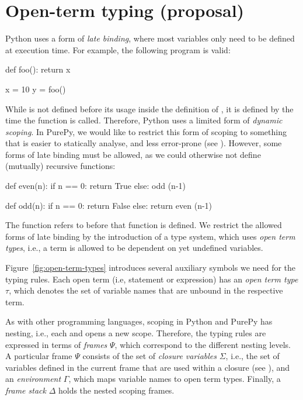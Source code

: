 \clearpage
\section{Open-term typing (proposal)}


Python uses a form of \emph{late binding}, where most variables only need to be defined at execution time. For example, 
the following program is valid: 

\begin{python}
def foo():
    return x

x = 10
y = foo()
\end{python}

While  is not defined before its usage inside the definition of , it is defined by the
time the function is called. Therefore, Python uses a limited form of \emph{dynamic scoping}. In PurePy, we would
like to restrict this form of scoping to something that is easier to statically analyse, and less error-prone 
(see ). However, some forms of late binding must be allowed, as we could otherwise not
define (mutually) recursive functions:

\begin{python}
def even(n):
    if n == 0: return True
    else: odd (n-1)

def odd(n):
    if n == 0: return False
    else: return even (n-1)
\end{python}

The function  refers to  before that function is defined. We restrict the
allowed forms of late binding by the introduction of a type system, which uses \emph{open term types},
i.e., a term is allowed to be dependent on yet undefined variables.

Figure~\ref{fig:open-term-types} introduces several auxiliary symbols we need for the typing rules. Each
open term (i.e, statement or expression) has an \emph{open term type} $\tau$, which denotes the set of
variable names that are unbound in the respective term.

As with other programming languages, scoping in Python and PurePy has nesting, i.e., each 
and  opens a new scope. Therefore, the typing rules are expressed in terms of 
\emph{frames} $\Psi$, which correspond to the different nesting levels. A particular frame $\Psi$ consists
of the set of \emph{closure variables} $\Sigma$, i.e., the set of variables defined in the current frame
that are used within a closure (see ), and an \emph{environment} $\Gamma$,
which maps variable names to open term types. Finally, a \emph{frame stack} $\Delta$ holds the nested
scoping frames.

